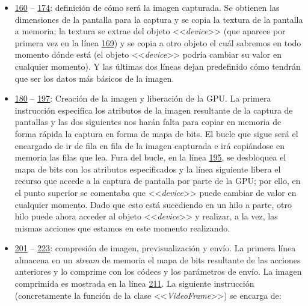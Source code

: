 \documentclass[12pt, a4paper]{book} %
\begin{document}
				\hspace*{2cm}
				\begin{itemize}
					\item \hyperlink{../Baco/Recorder/ScreenRecorder.cs160}{160} -- \hyperlink{../Baco/Recorder/ScreenRecorder.cs174}{174}: definición de cómo será la imagen capturada. Se obtienen las dimensiones de la pantalla para la captura y se copia la textura de la pantalla a memoria; la textura se extrae del objeto <<\textit{device}>> (que aparece por primera vez en la línea \hyperlink{../Baco/Recorder/ScreenRecorder.cs169}{169}) y se copia a otro objeto el cuál sabremos en todo momento dónde está (el objeto <<\textit{device}>> podría cambiar su valor en cualquier momento). Y las últimas dos líneas dejan predefinido cómo tendrán que ser los datos más básicos de la imagen.
					\item \hyperlink{../Baco/Recorder/ScreenRecorder.cs180}{180} -- \hyperlink{../Baco/Recorder/ScreenRecorder.cs197}{197}: Creación de la imagen y liberación de la GPU. La primera instrucción especifica los atributos de la imagen resultante de la captura de pantallas y las dos siguientes nos harán falta para copiar en memoria de forma rápida la captura en forma de mapa de bits. El bucle que sigue será el encargado de ir de fila en fila de la imagen capturada e irá copiándose en memoria las filas que lea. Fura del bucle, en la línea \hyperlink{../Baco/Recorder/ScreenRecorder.cs195}{195}, se desbloquea el mapa de bits con los atributos especificados y la línea siguiente libera el recurso que accede a la captura de pantalla por parte de la GPU; por ello, en el punto superior se comentaba que <<\textit{device}>> puede cambiar de valor en cualquier momento. Dado que esto está sucediendo en un hilo a parte, otro hilo puede ahora acceder al objeto <<\textit{device}>> y realizar, a la vez, las mismas acciones que estamos en este momento realizando.
					\item \hyperlink{../Baco/Recorder/ScreenRecorder.cs201}{201} -- \hyperlink{../Baco/Recorder/ScreenRecorder.cs223}{223}: compresión de imagen, previsualización y envío. La primera línea almacena en un \textit{stream} de memoria el mapa de bits resultante de las acciones anteriores y lo comprime con los códecs y los parámetros de envío. La imagen comprimida es mostrada en la línea \hyperlink{../Baco/Recorder/ScreenRecorder.cs211}{211}. La siguiente instrucción (concretamente la función de la clase <<\textit{VideoFrame}>>) se encarga de:

\end{itemize}
\end{document}
